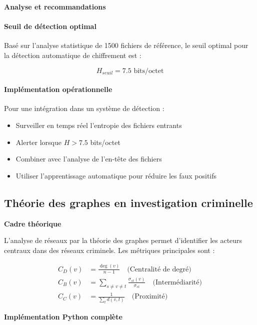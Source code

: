 \documentclass[12pt,a4paper]{article}
\begin{document}
\textbf{Analyse et recommandations}

\paragraph{Seuil de détection optimal}
Basé sur l'analyse statistique de 1500 fichiers de référence, le seuil optimal pour la détection automatique de chiffrement est :

\[H_{seuil} = 7.5 \text{ bits/octet}\]

\paragraph{Implémentation opérationnelle}
Pour une intégration dans un système de détection :
\begin{itemize}
\item Surveiller en temps réel l'entropie des fichiers entrants
\item Alerter lorsque $H > 7.5$ bits/octet
\item Combiner avec l'analyse de l'en-tête des fichiers
\item Utiliser l'apprentissage automatique pour réduire les faux positifs
\end{itemize}

\subsection{Théorie des graphes en investigation criminelle}

\textbf{Cadre théorique}

L'analyse de réseaux par la théorie des graphes permet d'identifier les acteurs centraux dans des réseaux criminels. Les métriques principales sont :

\begin{align*}
C_D(v) &= \frac{\deg(v)}{n-1} \quad \text{(Centralité de degré)} \\
C_B(v) &= \sum_{s\neq v\neq t} \frac{\sigma_{st}(v)}{\sigma_{st}} \quad \text{(Intermédiarité)} \\
C_C(v) &= \frac{1}{\sum_{t} d(v,t)} \quad \text{(Proximité)}
\end{align*}

\textbf{Implémentation Python complète}
\end{document}
